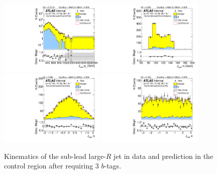 \begin{figure}[htbp!]
\begin{center}
\includegraphics[angle=270, width=0.45\textwidth]{./figures/boosted/Control/b77_ThreeTag_Control_sublHCand_Pt_m_1.pdf}
\includegraphics[angle=270, width=0.45\textwidth]{./figures/boosted/Control/b77_ThreeTag_Control_sublHCand_Mass_s.pdf}\\
\includegraphics[angle=270, width=0.45\textwidth]{./figures/boosted/Control/b77_ThreeTag_Control_sublHCand_Eta.pdf}
\includegraphics[angle=270, width=0.45\textwidth]{./figures/boosted/Control/b77_ThreeTag_Control_sublHCand_Phi.pdf}
  \caption{Kinematics of the sub-lead large-$R$ jet in data and prediction in the control region after requiring 3 $b$-tags. }
  \label{fig:boosted-3b-control-ak10-subl}
\end{center}
\end{figure}

